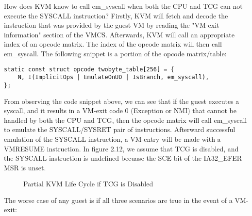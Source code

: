 \documentclass{report}
\begin{document}
\begin{spacing}{1.5}
{\large
\noindent How does KVM know to call em\_syscall when both the CPU and TCG can not execute the SYSCALL instruction? Firstly, KVM will fetch and decode the instruction that was provided by the guest VM by reading the "VM-exit information" section of the VMCS. Afterwards, KVM will call an appropriate index of an opcode matrix. The index of the opcode matrix will then call em\_syscall. The following snippet is a portion of the opcode matrix/table:
\newline
}





\begin{lstlisting}[caption={/arch/x86/kvm/emulate.c:2712 | Linux kernel V5.18.8},captionpos=b]
static const struct opcode twobyte_table[256] = {
    N, I(ImplicitOps | EmulateOnUD | IsBranch, em_syscall),
};
\end{lstlisting}

{\large
\noindent From observing the code snippet above, we can see that if the guest executes a syscall, and it results in a VM-exit code 0 (Exception or NMI) that cannot be handled by both the CPU and TCG, then the opcode matrix will call em\_syscall to emulate the SYSCALL/SYSRET pair of instructions. Afterward successful emulation of the SYSCALL instruction, a VM-entry will be made with a VMRESUME instruction. In figure 2.12, we assume that TCG is disabled, and the SYSCALL instruction is undefined becuase the SCE bit of the IA32\_EFER MSR is unset.
\leavevmode\newline
}

{}
\begin{figure}[ht]
    \centering
    \caption{Partial KVM Life Cycle if TCG is Disabled}
\end{figure}




{\large
\noindent The worse case of any guest is if all three scenarios are true in the event of a VM-exit:

}
\end{spacing}
\end{document}
